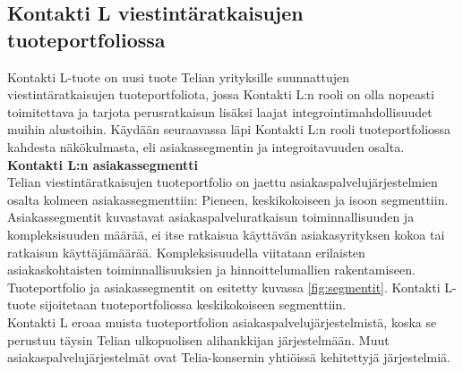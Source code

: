 \documentclass[finnish,12pt,a4paper,pdftex]{article}
\begin{document}


\subsection{Kontakti L viestintäratkaisujen tuoteportfoliossa}

Kontakti L-tuote on uusi tuote Telian yrityksille suunnattujen viestintäratkaisujen tuoteportfoliota, jossa Kontakti L:n rooli on olla nopeasti toimitettava ja tarjota perusratkaisun lisäksi laajat integrointimahdollisuudet muihin alustoihin. Käydään seuraavassa läpi Kontakti L:n rooli tuoteportfoliossa kahdesta näkökulmasta, eli asiakassegmentin ja integroitavuuden osalta.\\

\textbf{Kontakti L:n asiakassegmentti}\\

Telian viestintäratkaisujen tuoteportfolio on jaettu asiakaspalvelujärjestelmien osalta kolmeen asiakassegmenttiin: Pieneen, keskikokoiseen ja isoon segmenttiin. Asiakassegmentit kuvastavat asiakaspalveluratkaisun toiminnallisuuden ja kompleksisuuden määrää, ei itse ratkaisua käyttävän asiakasyrityksen kokoa tai ratkaisun käyttäjämäärää. Kompleksisuudella viitataan erilaisten asiakaskohtaisten toiminnallisuuksien ja hinnoittelumallien rakentamiseen. Tuoteportfolio ja asiakassegmentit on esitetty kuvassa \ref{fig:segmentit}. Kontakti L-tuote sijoitetaan tuoteportfoliossa keskikokoiseen segmenttiin.\\

Kontakti L eroaa muista tuoteportfolion asiakaspalvelujärjestelmistä, koska se perustuu täysin Telian ulkopuolisen alihankkijan järjestelmään. Muut asiakaspalvelujärjestelmät ovat Telia-konsernin yhtiöissä kehitettyjä järjestelmiä.\\ 
\end{document}
